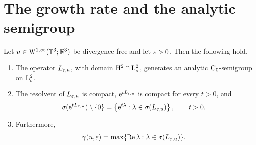\section{The growth rate and the analytic semigroup}

\begin{lemma}
  \label{lem:semigroup-spectral-growth}
  \leanok
  Let $u\in\mathrm{W}^{1,\infty}(\mathbb{T}^3;\mathbb{R}^3) $ be divergence-free and let $\varepsilon>0 $.  Then the
  following hold.
  \begin{enumerate}
    \item The operator $L_{\varepsilon,u} $, with domain $\mathrm{H}^2\cap\mathrm{L}^2_\sigma $, generates an
      analytic $\mathrm{C}_0 $-semigroup on $\mathrm{L}^2_\sigma $.
    \item The resolvent of $L_{\varepsilon,u} $ is compact, $\mathrm{e}^{tL_{\varepsilon,u}} $ is compact for
      every $t>0 $, and
      \begin{equation}
        \sigma(\mathrm{e}^{tL_{\varepsilon,u}})\setminus\{0\}
        =\left\{\mathrm{e}^{t\lambda}:\lambda\in\sigma(L_{\varepsilon,u})\right\},
        \qquad t>0.
        \label{eq:dynamics:compact-semigroup-spectral-mapping}
      \end{equation}
    \item Furthermore,
      \begin{equation}
        \gamma(u,\varepsilon)
        =\max\{\operatorname{Re}\lambda:\lambda\in\sigma(L_{\varepsilon,u})\}.
        \label{eq:dynamics:growth-rate-spectral-bound}
      \end{equation}
  \end{enumerate}
\end{lemma}


